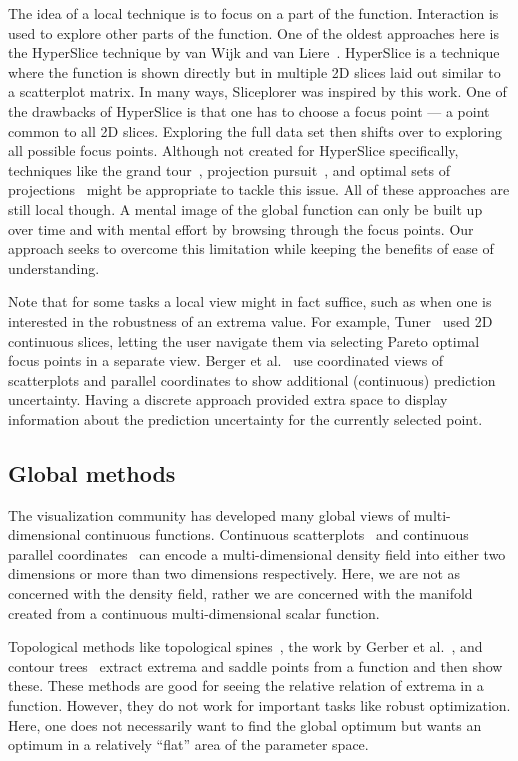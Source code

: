 The idea of a local technique is to focus on a part of the function.
Interaction is used to explore other parts of the function. One of the oldest
approaches here is the HyperSlice technique by van Wijk and van
Liere~\cite{Wijk:1993}.  HyperSlice is a technique where the function is shown
directly but in multiple 2D slices laid out similar to a scatterplot matrix. In
many ways, Sliceplorer was inspired by this work. One of the drawbacks of
HyperSlice is that one has to choose a focus point --- a point common to all 2D
slices. Exploring the full data set then shifts over to exploring all possible
focus points. Although not created for HyperSlice specifically,  techniques
like the grand tour~\cite{Asimov:1985}, projection pursuit~\cite{Huber:1985},
and optimal sets of projections~\cite{Lehmann:2015b} might be appropriate to
tackle this issue.
All of these approaches are
still local though. A mental image of the global function can only be built up
over time and with mental effort by browsing through the focus points. Our
approach seeks to overcome this limitation while keeping the benefits of ease
of understanding.  

Note that for some tasks a local view might in fact suffice, such as when one is interested in the robustness of an extrema value. 
For example, Tuner~\cite{Torsney-Weir:2011} used 2D
continuous slices, letting the user navigate them via selecting Pareto optimal focus points in a separate view. 
Berger et al.~\cite{Berger:2011} use coordinated views of
scatterplots and parallel coordinates to show additional (continuous) prediction uncertainty. Having a discrete approach provided extra space to display information about the prediction uncertainty for the currently selected point.

\subsection{Global methods}

The visualization community has developed many global views of
multi-dimensional continuous functions. Continuous
scatterplots~\cite{Bachthaler:2008} and continuous parallel
coordinates~\cite{Heinrich:2009} can encode a multi-dimensional density field
into either two dimensions or more than two dimensions respectively.  Here, we
are not as concerned with the density field, rather we are concerned with the
manifold created from a continuous multi-dimensional scalar function. 

Topological methods like topological
spines~\cite{Correa:2011}, the work by Gerber et al.~\cite{Gerber:2010}, and
contour trees~\cite{Carr:2003a} extract extrema and saddle points from a
function and then show these. These methods are good for seeing the relative
relation of extrema in a function. However, they do not work for important
tasks like robust optimization. Here, one does not necessarily want to find the
global optimum but wants an optimum in a relatively ``flat'' area of the
parameter space. 


